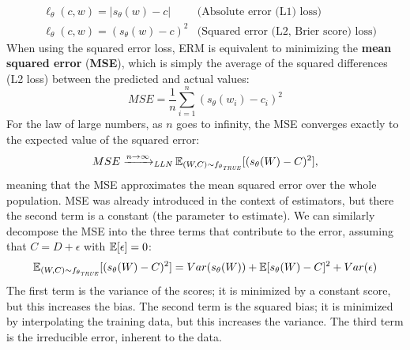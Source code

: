 \begin{align*}
    &\ell_{\theta}(c,w) = |s_{\theta}(w) - c| &\text{(Absolute error (L1) loss)}\\
    &\ell_{\theta}(c,w) = (s_{\theta}(w) - c)^2 &\text{(Squared error (L2, Brier score) loss)}
\end{align*}
When using the squared error loss, ERM is equivalent to minimizing the \textbf{mean squared error} (\textbf{MSE}), which is simply the average of the squared differences (L2 loss) between the predicted and actual values:
\begin{equation*}
    \textit{MSE} = \frac{1}{n}\sum_{i=1}^n (s_{\theta}(w_i) - c_i)^2
\end{equation*}
For the law of large numbers, as $n$ goes to infinity, the MSE converges exactly to the expected value of the squared error:
\begin{equation*}
    MSE \xrightarrow{n \to \infty}_{\textit{LLN}} \mathbb{E}_{(W,C) \sim f_{\theta_{\textit{TRUE}}}}[(s_{\theta}(W) - C)^2],
\end{equation*}
meaning that the MSE approximates the mean squared error over the whole population. MSE was already introduced in the context of estimators, but there the second term is a constant (the parameter to estimate). We can similarly decompose the MSE into the three terms that contribute to the error, assuming that $C = D + \epsilon$ with $\mathbb{E}[\epsilon] = 0$:
\begin{equation*}
    \mathbb{E}_{(W,C) \sim f_{\theta_{\textit{TRUE}}}} [(s_{\theta}(W) - C)^2] = Var(s_{\theta}(W)) + \mathbb{E}[s_{\theta}(W) - C]^2 + Var(\epsilon)
\end{equation*}
The first term is the variance of the scores; it is minimized by a constant score, but this increases the bias. The second term is the squared bias; it is minimized by interpolating the training data, but this increases the variance. The third term is the irreducible error, inherent to the data.
